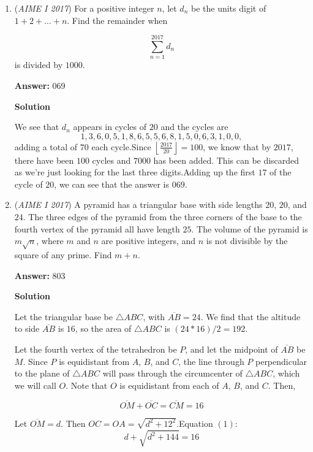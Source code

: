 \begin{enumerate}
 


	\item (\textit{AIME I 2017}) For a positive integer $n$, let $d_n$ be the units digit of $1 + 2 + \dots + n$. Find the remainder when

 \[\sum_{n=1}^{2017} d_n\]is divided by $1000$.


 
 \textbf{Answer: }069



\textbf{Solution}

We see that $d_n$ appears in cycles of $20$ and the cycles are 
 \[1,3,6,0,5,1,8,6,5,5,6,8,1,5,0,6,3,1,0,0,\] adding a total of $70$ each cycle.Since $\left\lfloor\frac{2017}{20}\right\rfloor=100$, we know that by $2017$, there have been $100$ cycles and $7000$ has been added. This can be discarded as we're just looking for the last three digits.Adding up the first $17$ of the cycle of $20$, we can see that the answer is $\boxed{069}$.

 


	\item (\textit{AIME I 2017}) A pyramid has a triangular base with side lengths $20$, $20$, and $24$. The three edges of the pyramid from the three corners of the base to the fourth vertex of the pyramid all have length $25$. The volume of the pyramid is $m\sqrt{n}$, where $m$ and $n$ are positive integers, and $n$ is not divisible by the square of any prime. Find $m+n$.


 
 \textbf{Answer: }803



\textbf{Solution}

Let the triangular base be $\triangle ABC$, with $\overline {AB} = 24$. We find that the altitude to side $\overline {AB}$ is $16$, so the area of $\triangle ABC$ is $(24*16)/2 = 192$.

 Let the fourth vertex of the tetrahedron be $P$, and let the midpoint of $\overline {AB}$ be $M$. Since $P$ is equidistant from $A$, $B$, and $C$, the line through $P$ perpendicular to the plane of $\triangle ABC$ will pass through the circumcenter of $\triangle ABC$, which we will call $O$. Note that $O$ is equidistant from each of $A$, $B$, and $C$. Then,

 
 \[\overline {OM} + \overline {OC} = \overline {CM} = 16\]

 Let $\overline {OM} = d$. Then $OC=OA=\sqrt{d^2+12^2}.$Equation $(1)$:
 \[d + \sqrt {d^2 + 144} = 16\]


\end{enumerate}
